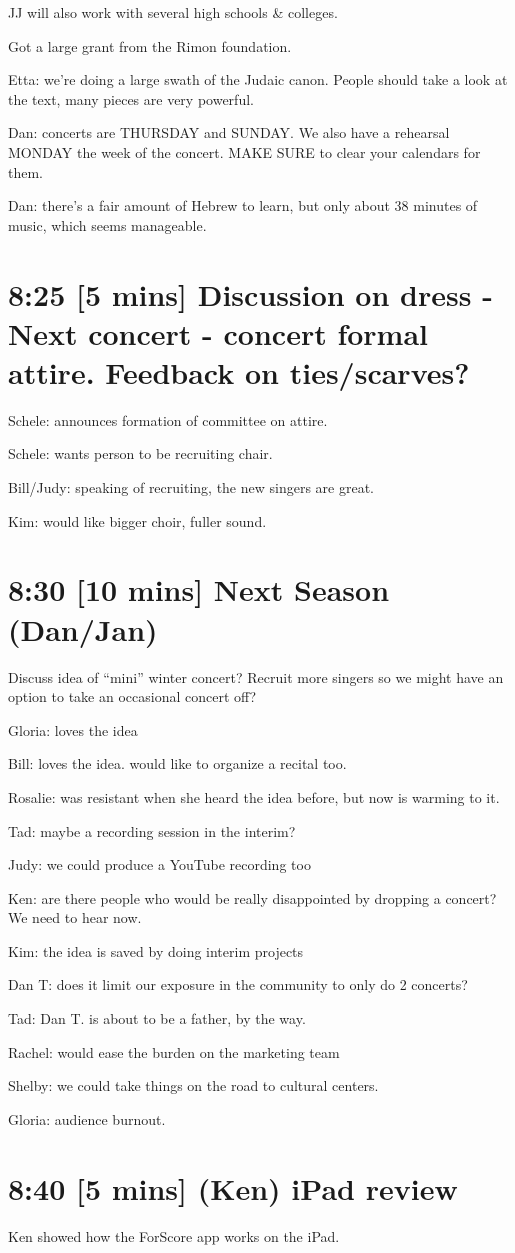 \documentclass[11pt]{article}
\begin{document}
JJ will also work with several high schools \& colleges.

Got a large grant from the Rimon foundation.

Etta: we're doing a large swath of the Judaic canon.  People should
take a look at the text, many pieces are very powerful.

Dan: concerts are THURSDAY and SUNDAY.  We also have a rehearsal
MONDAY the week of the concert.  MAKE SURE to clear your calendars for
them.

Dan: there's a fair amount of Hebrew to learn, but only about 38
minutes of music, which seems manageable.
\section{8:25 [5 mins] Discussion on dress - Next concert - concert formal attire.  Feedback on ties/scarves?}
\label{sec-9}


Schele: announces formation of committee on attire.

Schele: wants person to be recruiting chair.

Bill/Judy: speaking of recruiting, the new singers are great.

Kim: would like bigger choir, fuller sound.
\section{8:30 [10 mins] Next Season (Dan/Jan)}
\label{sec-10}


Discuss idea of ``mini'' winter concert?  Recruit more singers so we might have an option to take an occasional concert off?

Gloria: loves the idea

Bill: loves the idea.  would like to organize a recital too.

Rosalie: was resistant when she heard the idea before, but now is
warming to it.

Tad: maybe a recording session in the interim?

Judy: we could produce a YouTube recording too

Ken: are there people who would be really disappointed by dropping a
concert?  We need to hear now.

Kim: the idea is saved by doing interim projects

Dan T: does it limit our exposure in the community to only do 2
concerts?

Tad: Dan T. is about to be a father, by the way.

Rachel: would ease the burden on the marketing team

Shelby: we could take things on the road to cultural centers.

Gloria: audience burnout.
\section{8:40 [5 mins] (Ken) iPad review}
\label{sec-11}


Ken showed how the ForScore app works on the iPad.
\end{document}
